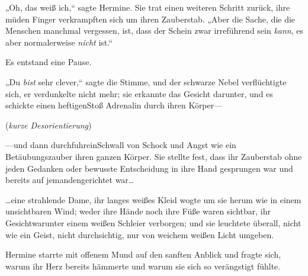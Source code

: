 „Oh, das weiß ich,“ sagte Hermine. Sie trat einen weiteren Schritt zurück, ihre müden Finger verkrampften sich um ihren Zauberstab. „Aber die Sache, die die Menschen manchmal vergessen, ist, dass der Schein zwar irreführend sein \emph{kann}, es aber normalerweise \emph{nicht} ist.“

Es entstand eine Pause.

„Du \emph{bist} sehr clever,“ sagte die Stimme, und der schwarze Nebel verflüchtigte sich, er verdunkelte nicht mehr; sie erkannte das Gesicht darunter, und es schickte einen heftigenStoß Adrenalin durch ihren Körper—

(\emph{kurze Desorientierung})

—und dann durchfuhreinSchwall von Schock und Angst wie ein Betäubungszauber ihren ganzen Körper. Sie stellte fest, dass ihr Zauberstab ohne jeden Gedanken oder bewusste Entscheidung in ihre Hand gesprungen war und bereits auf jemandengerichtet war…

…eine strahlende Dame, ihr langes weißes Kleid wogte um sie herum wie in einem unsichtbaren Wind; weder ihre Hände noch ihre Füße waren sichtbar, ihr Gesichtwarunter einem weißen Schleier verborgen; und sie leuchtete überall, nicht wie ein Geist, nicht durchsichtig, nur von weichem weißen Licht umgeben.

Hermine starrte mit offenem Mund auf den sanften Anblick und fragte sich, warum ihr Herz bereits hämmerte und warum sie sich so verängstigt fühlte.

